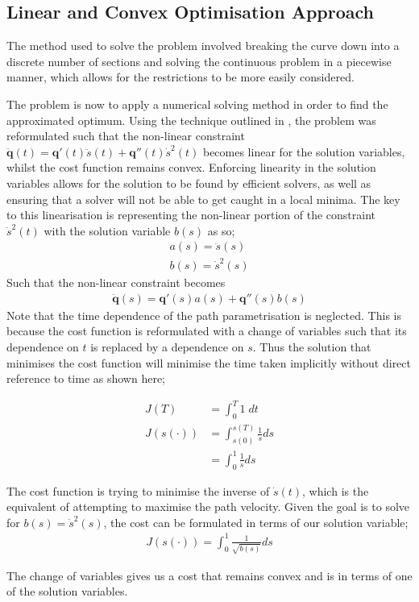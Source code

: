 \subsection{Linear and Convex Optimisation Approach}
The method used to solve the problem involved breaking the curve down into a discrete number of sections and solving the continuous problem in a piecewise manner, which allows for the restrictions to be more easily considered.

The problem is now to apply a numerical solving method in order to find the approximated optimum. Using the technique outlined in \cite{Schutter09}, the problem was reformulated such that the non-linear constraint $\ddot{\textbf{q}}(t) = \textbf{q}'(t)\ddot{s}(t) + \textbf{q}''(t)\dot{s}^2(t)$ becomes linear for the solution variables, whilst the cost function remains convex. Enforcing linearity in the solution variables allows for the solution to be found by efficient solvers, as well as ensuring that a solver will not be able to get caught in a local minima.
The key to this linearisation is representing the non-linear portion of the constraint $\dot{s}^2(t)$ with the solution variable $b(s)$ as so;
\begin{align*}
a(s) = \ddot{s}(s)\\
b(s) = \dot{s}^2(s)
\end{align*}
Such that the non-linear constraint becomes
\begin{align*}
\ddot{\textbf{q}}(s) = \textbf{q}'(s)a(s) + \textbf{q}''(s)b(s)
\end{align*}
Note that the time dependence of the path parametrisation is neglected. This is because the cost function is reformulated with a change of variables such that its dependence on $t$ is replaced by a dependence on $s$. Thus the solution that minimises the cost function will minimise the time taken implicitly without direct reference to time as shown here;

\begin{align*}
J(T) &= \int_0^T1\;dt\\
J(s(\cdot)) &= \int_{s(0)}^{s(T)} \frac{1}{\dot{s}}ds\\
	&= \int_0^1\frac{1}{\dot{s}}ds
\end{align*}

The cost function is trying to minimise the inverse of $\dot{s}(t)$, which is the equivalent of attempting to maximise the path velocity. Given the goal is to solve for $b(s) = \dot{s}^2(s)$, the cost can be formulated in terms of our solution variable;
\begin{align*}
J(s(\cdot)) = \int_0^1\frac{1}{\sqrt{b(s)}}ds
\end{align*}

The change of variables gives us a cost that remains convex and is in terms of one of the solution variables.